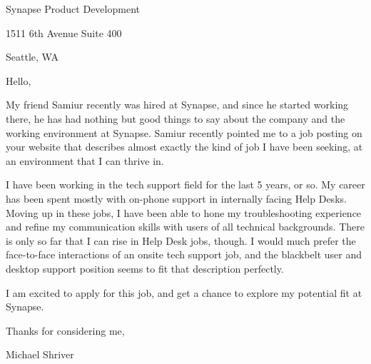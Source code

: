 \documentclass[10pt,oneside]{article}
\begin{document}
\hfill\dte
\heading
\vspace{\baselineskip}

Synapse Product Development

1511 6th Avenue Suite 400

Seattle, WA

\vspace{\baselineskip}
\vspace{\baselineskip}

Hello,

\vspace{\baselineskip}

My friend Samiur recently was hired at Synapse, and since he started working there, he has had nothing but good things to say about the company and the working environment at Synapse. Samiur recently pointed me to a job posting on your website that describes almost exactly the kind of job I have been seeking, at an environment that I can thrive in.

\vspace{\baselineskip}

I have been working in the tech support field for the last 5 years, or so. My career has been spent mostly with on-phone support in internally facing Help Desks. Moving up in these jobs, I have been able to hone my troubleshooting experience and refine my communication skills with users of all technical backgrounds. There is only so far that I can rise in Help Desk jobs, though. I would much prefer the face-to-face interactions of an onsite tech support job, and the blackbelt user and desktop support position seems to fit that description perfectly.

\vspace{\baselineskip}

I am excited to apply for this job, and get a chance to explore my potential fit at Synapse.

\vspace{\baselineskip}

Thanks for considering me,

\vspace{\baselineskip}

Michael Shriver
\end{document}
